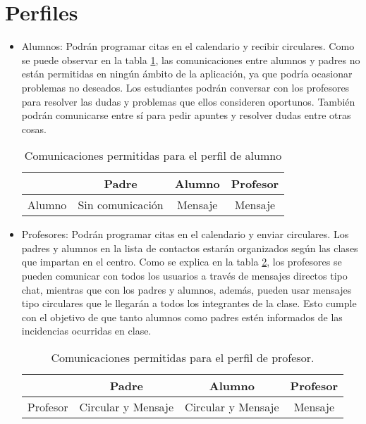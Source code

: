 	\section{Perfiles}
		\begin{itemize}
			\item Alumnos: Podrán programar citas en el calendario y recibir circulares. Como se puede observar en la tabla \ref{table:studentsCommunications}, las comunicaciones entre alumnos y padres no están permitidas en ningún ámbito de la aplicación, ya que podría ocasionar problemas no deseados.
			Los estudiantes podrán conversar con los profesores para resolver las dudas y problemas que ellos consideren oportunos. También podrán comunicarse entre sí para pedir apuntes y resolver dudas entre otras cosas.
			
			\begin{table} [!hbt]
				\begin{center}
					\begin{tabular}{|| c | c | c | c ||}
						\hline
						\hline
						& Padre & Alumno & Profesor \\
						\hline
						Alumno & Sin comunicación & Mensaje & Mensaje \\
						\hline
						\hline
					\end{tabular}
					\caption{Comunicaciones permitidas para el perfil de alumno}
					\label{table:studentsCommunications}
				\end{center}
			\end{table}
			
			\item Profesores: Podrán programar citas en el calendario y enviar circulares. Los padres y alumnos en la lista de contactos estarán organizados según las clases que impartan en el centro. Como se explica en la tabla \ref{table:teachersCommunications}, los profesores se pueden comunicar con todos los usuarios a través de mensajes directos tipo chat, mientras que con los padres y alumnos, además, pueden usar mensajes tipo circulares que le llegarán a todos los integrantes de la clase. Esto cumple con el objetivo de que tanto alumnos como padres estén informados de las incidencias ocurridas en clase.
			
			\begin{table} [!hbt]
				\begin{center}
					\begin{tabular}{|| c | c | c | c ||}
						\hline
						\hline
						& Padre & Alumno & Profesor \\
						\hline
						Profesor & Circular y Mensaje & Circular y Mensaje & Mensaje \\
						\hline
						\hline
					\end{tabular}
					\caption{Comunicaciones permitidas para el perfil de profesor.}
					\label{table:teachersCommunications}
				\end{center}
			\end{table}
			

\end{itemize}
